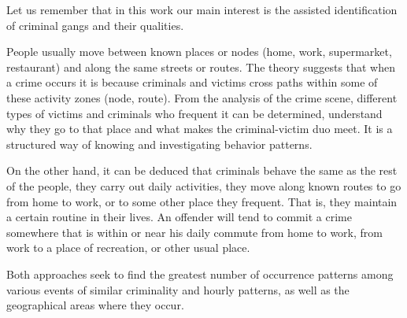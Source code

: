 Let us remember that in this work our main interest is the assisted identification of criminal gangs and their qualities.

People usually move between known places or nodes (home, work, supermarket, restaurant) and along the same streets or routes. The theory suggests that when a crime occurs it is because criminals and victims cross paths within some of these activity zones (node, route). From the analysis of the crime scene, different types of victims and criminals who frequent it can be determined, understand why they go to that place and what makes the criminal-victim duo meet. It is a structured way of knowing and investigating behavior patterns.

On the other hand, it can be deduced that criminals behave the same as the rest of the people, they carry out daily activities, they move along known routes to go from home to work, or to some other place they frequent. That is, they maintain a certain routine in their lives. An offender will tend to commit a crime somewhere that is within or near his daily commute from home to work, from work to a place of recreation, or other usual place.

Both approaches seek to find the greatest number of occurrence patterns among various events of similar criminality and hourly patterns, as well as the geographical areas where they occur.

